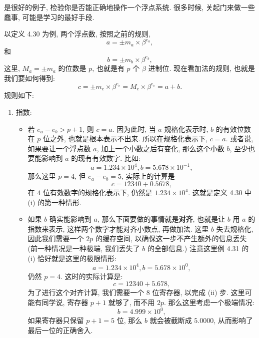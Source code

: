\documentclass[a4paper]{ctexart}
\begin{document}
{ 是很好的例子,
检验你是否能正确地操作一个浮点系统. 很多时候, 关起门来做一些蠢事,
可能是学习的最好手段.

以定义 4.30 为例, 两个浮点数, 按照之前的规则,
$$
a = \pm m_a \times \beta^{e_a},  
$$
和
$$
b = \pm m_b \times \beta^{e_b},  
$$
这里, $M_a = \pm m_a$ 的位数是 $p$, 也就是有 $p$ 个 $\beta$ 进制位.
现在看加法的规则, 也就是我们要如何得到:
$$
c = \pm m_c \times \beta^{e_c} = M_c \times \beta^{e_c} = a + b.
$$
规则如下:
\begin{enumerate}
\item 指数:
  \begin{itemize}
  \item 若 $e_a - e_b > p + 1$, 则 $c = a$. 因为此时,
    当 $a$ 规格化表示时, $b$ 的有效位数在 $p$ 位之外,
    也就是根本表示不出来. 所以在规格化表示下, $c = a$.
    或者说, 如果要让一个浮点数 $a$, 加上一个小数之后有变化,
    那么这个小数 $b$, 至少也要能影响到 $a$ 的现有有效数字.
    比如:
    $$
    a = 1.234 \times 10^4, b = 5.678 \times 10^{-1},
    $$
    那么这里 $p = 4$, 但 $e_a - e_b = 5$, 实际上的计算是
    $$
    c = 12340 + 0.5678, 
    $$
    在 $4$ 位有效数字的规格化表示下, 仍然是 $1.234 \times 10^4$.
    这就是定义 4.30 中 (i) 的第一种情形.  
  \item 如果 $b$ 确实能影响到 $a$, 那么下面要做的事情就是{\bf 对齐},
    也就是让 $b$ 用 $a$ 的指数来表示, 这样两个数字才能对齐小数点,
    再做加法. 这里 $b$ 失去规格化, 因此我们需要一个 $2 p$ 的缓存空间,
    以确保这一步不产生额外的信息丢失 (前一种情况是一种极端, 我们丢失了 $b$ 的全部信息.)
    注意这里例 4.31 的 (i) 恰好就是这里的极限情形:
    $$
    a = 1.234 \times 10^4, b = 5.678 \times 10^{0},
    $$
    仍然 $p = 4$. 这时的实际计算是:
    $$
    c = 12340 + 5.678, 
    $$
    为了进行这个对齐计算, 我们需要一个 $8$ 位寄存器, 以完成 (ii)
    步. 
    这里可能有同学说, 寄存器 $p + 1$ 就够了, 而不用 $2p$. 
    那么这里考虑一个极端情况:
    $$
    b = 4.999 \times 10^{0},
    $$
    如果寄存器只保留 $p + 1 = 5$ 位, 
    那么 $b$ 就会被截断成 $5.0000$, 从而影响了最后一位的正确舍入.
  

\end{itemize}
\end{enumerate}}
\end{document}

